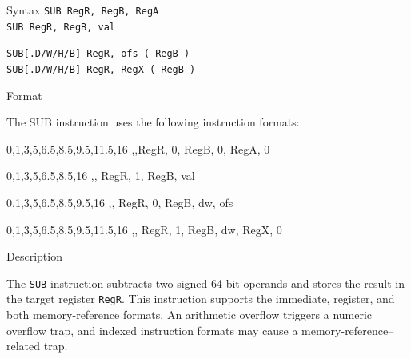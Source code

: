 %
%
\pagebreak
{}

\begin{iPageDescEntry}{Syntax} 
  \texttt{SUB RegR, RegB, RegA} \\
  \texttt{SUB RegR, RegB, val}
  
  \texttt{SUB[.D/W/H/B] RegR, ofs ( RegB )} \\
  \texttt{SUB[.D/W/H/B] RegR, RegX ( RegB )}
\end{iPageDescEntry}

\begin{iPageDescEntry}{Format}

The SUB instruction uses the following instruction formats: \\
	
\begin{flushleft}	

	\drawInstrFormat
  	{0,1,3,5,6.5,8.5,9.5,11.5,16}
  	{\OpCodeGrpALU,\OpCodeSUB,RegR, 0, RegB, 0, RegA, 0}
	
	\drawInstrFormat
  	{0,1,3,5,6.5,8.5,16}
  	{\OpCodeGrpALU,\OpCodeSUB, RegR, 1, RegB, val}

	\drawInstrFormat
  	{0,1,3,5,6.5,8.5,9.5,16}
  	{\OpCodeGrpMEM,\OpCodeSUB, RegR, 0, RegB, dw, ofs}
 
	\drawInstrFormat
  	{0,1,3,5,6.5,8.5,9.5,11.5,16}
  	{\OpCodeGrpMEM,\OpCodeSUB, RegR, 1, RegB, dw, RegX, 0}

\end{flushleft}  

\end{iPageDescEntry}

\begin{iPageDescEntry}{Description}

The \texttt{SUB} instruction subtracts two signed 64-bit operands and stores the result in the target register \texttt{RegR}. This instruction supports the immediate, register, and both memory-reference formats. An arithmetic overflow triggers a numeric overflow trap, and indexed instruction formats may cause a memory-reference–related trap.
\end{iPageDescEntry}

